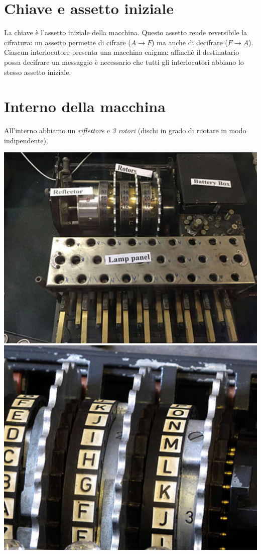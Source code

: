 \section{Chiave e assetto iniziale} La chiave è l'assetto iniziale della macchina. Questo assetto rende reversibile la cifratura: un assetto permette di cifrare ($A \xrightarrow{} F$) ma anche di decifrare ($F \xrightarrow{} A$). Ciascun interlocutore presenta una macchina enigma: affinchè il destinatario possa decifrare un messaggio è necessario che tutti gli interlocutori abbiano lo stesso assetto iniziale.

\section{Interno della macchina} All'interno abbiamo un \emph{riflettore} e \emph{3 rotori} (dischi in grado di ruotare in modo indipendente). 
\begin{center}
	\includegraphics[scale=.4]{images/15.PNG}
	\includegraphics[scale=.33]{images/16.PNG}
\end{center}
